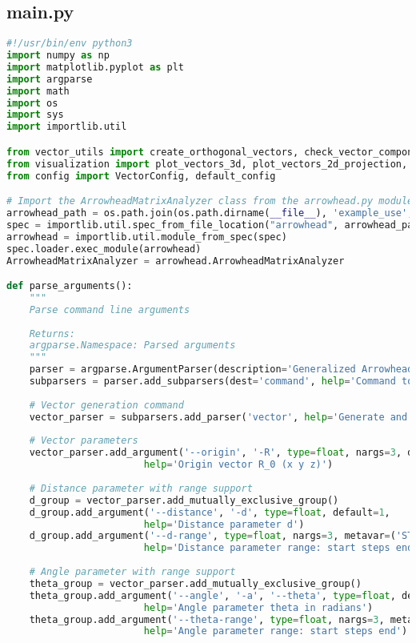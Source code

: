 \subsection{main.py}

\begin{lstlisting}[language=Python]
#!/usr/bin/env python3
import numpy as np
import matplotlib.pyplot as plt
import argparse
import math
import os
import sys
import importlib.util

from vector_utils import create_orthogonal_vectors, check_vector_components, generate_R_vector
from visualization import plot_vectors_3d, plot_vectors_2d_projection, plot_all_projections, plot_multiple_vectors
from config import VectorConfig, default_config

# Import the ArrowheadMatrixAnalyzer class from the arrowhead.py module
arrowhead_path = os.path.join(os.path.dirname(__file__), 'example_use', 'arrowhead_matrix', 'arrowhead.py')
spec = importlib.util.spec_from_file_location("arrowhead", arrowhead_path)
arrowhead = importlib.util.module_from_spec(spec)
spec.loader.exec_module(arrowhead)
ArrowheadMatrixAnalyzer = arrowhead.ArrowheadMatrixAnalyzer

def parse_arguments():
    """
    Parse command line arguments
    
    Returns:
    argparse.Namespace: Parsed arguments
    """
    parser = argparse.ArgumentParser(description='Generalized Arrowhead Framework')
    subparsers = parser.add_subparsers(dest='command', help='Command to execute')
    
    # Vector generation command
    vector_parser = subparsers.add_parser('vector', help='Generate and visualize orthogonal vectors')
    
    # Vector parameters
    vector_parser.add_argument('--origin', '-R', type=float, nargs=3, default=[0, 0, 0],
                        help='Origin vector R_0 (x y z)')
    
    # Distance parameter with range support
    d_group = vector_parser.add_mutually_exclusive_group()
    d_group.add_argument('--distance', '-d', type=float, default=1,
                        help='Distance parameter d')
    d_group.add_argument('--d-range', type=float, nargs=3, metavar=('START', 'STEPS', 'END'),
                        help='Distance parameter range: start steps end')
    
    # Angle parameter with range support
    theta_group = vector_parser.add_mutually_exclusive_group()
    theta_group.add_argument('--angle', '-a', '--theta', type=float, default=math.pi/4,
                        help='Angle parameter theta in radians')
    theta_group.add_argument('--theta-range', type=float, nargs=3, metavar=('START', 'STEPS', 'END'),
                        help='Angle parameter range: start steps end')
    

\end{lstlisting}
